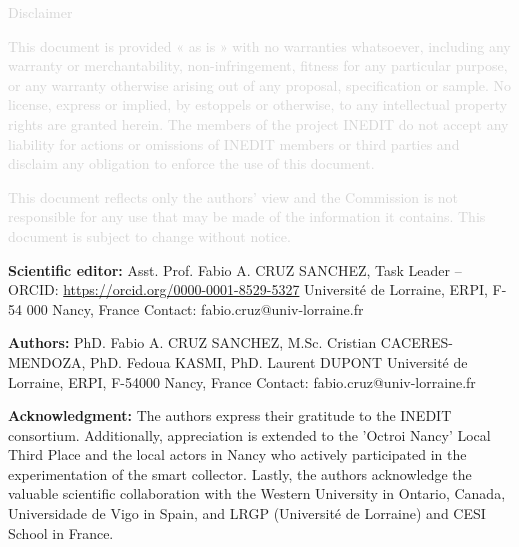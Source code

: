 \documentclass[
  11pt,
]{article}
\begin{document}
\vfill

\begin{center}
\textcolor{lightgray}{Disclaimer}

\textcolor{lightgray}{
\small
This document is provided « as is » with no warranties whatsoever, including any warranty or merchantability, non-infringement, fitness for any particular purpose, or any warranty otherwise arising out of any proposal, specification or sample.  No license, express or implied, by estoppels or otherwise, to any intellectual property rights are granted herein. The members of the project INEDIT do not accept any liability for actions or omissions of INEDIT members or third parties and disclaim any obligation to enforce the use of this document. }

\textcolor{lightgray}{
This document reflects only the authors' view and the Commission is not responsible for any use that may be made of the information it contains.  This document is subject to change without notice. 
}
\end{center}
\normalsize


\newpage

\vfill



\textbf{Scientific editor:} \newline
Asst. Prof. Fabio A. CRUZ SANCHEZ, Task Leader – ORCID: \href{https://orcid.org/0000-0001-8529-5327}{https://orcid.org/0000-0001-8529-5327} \newline
Université de Lorraine, ERPI, F-54 000 Nancy, France \newline
Contact: fabio.cruz@univ-lorraine.fr 

\vspace{2cm}

\textbf{Authors:} \newline
PhD. Fabio A. CRUZ SANCHEZ, M.Sc. Cristian CACERES-MENDOZA, PhD. Fedoua KASMI, PhD. Laurent DUPONT \newline
Université de Lorraine, ERPI, F-54000 Nancy, France \newline
Contact: fabio.cruz@univ-lorraine.fr 

\vspace{2cm}

\textbf{Acknowledgment:}\newline
The authors express their gratitude to the INEDIT consortium. 
Additionally, appreciation is extended to the 'Octroi Nancy' Local Third Place and the local actors in Nancy who actively participated in the experimentation of the smart collector. 
Lastly, the authors acknowledge the valuable scientific collaboration with the Western University in Ontario, Canada, 
Universidade de Vigo in Spain, 
and  LRGP (Université de Lorraine) and CESI School in France.
\vspace{2cm}
\end{document}
